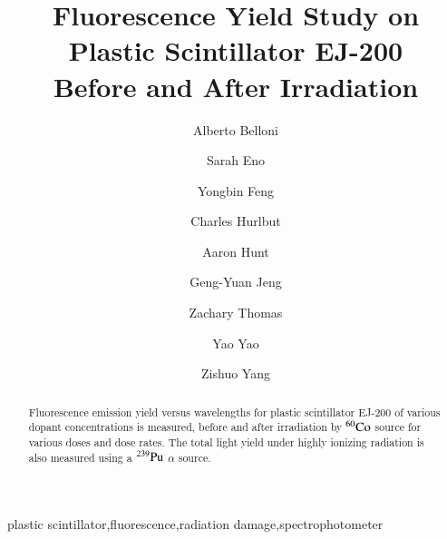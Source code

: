 \documentclass[preprint,12pt]{elsarticle}
\begin{document}
\begin{frontmatter}



\title{Fluorescence Yield Study on Plastic Scintillator EJ-200\\ Before and After Irradiation}


\author[umd]{Alberto Belloni}
\author[umd]{Sarah Eno}
\author[umd]{Yongbin Feng}
\author[eljen]{Charles Hurlbut}
\author[umd]{Aaron Hunt}
\author[umd]{Geng-Yuan Jeng}
\author[umd]{Zachary Thomas}
\author[umd]{Yao Yao}
\author[umd]{Zishuo Yang}

\address[umd]{Department of Physics, University of Maryland, College Park, MD 20740, USA}
\address[eljen]{Eljen Technology, 1300 W. Broadway, Sweetwater, TX 79556, USA}

\begin{abstract}
Fluorescence emission yield versus wavelengths for plastic scintillator EJ-200 of various dopant concentrations is measured,
 before and after irradiation by $\rm {^{60}Co}$ source for various doses and dose rates. 
The total light yield under highly ionizing radiation is also measured using a $\rm {^{239}Pu}$ $\alpha$ source. 

\end{abstract}

\begin{keyword}
plastic scintillator\sep fluorescence\sep radiation damage\sep spectrophotometer

\end{keyword}

\end{frontmatter}
\end{document}
